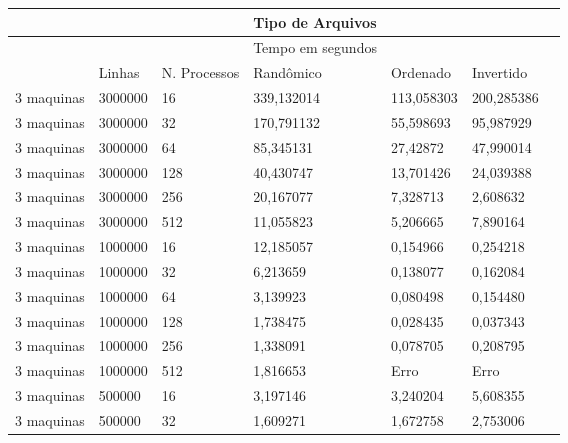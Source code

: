 \documentclass[12pt]{article}
\begin{document}
\begin{table}[]
\begin{tabular}{l|llllll}
           &                 &                     & Tipo de Arquivos  &            &            \\  \hline
           &                 &                     & Tempo em segundos &            &            \\ \hline
           & Linhas & N. Processos & Randômico         & Ordenado   & Invertido  \\ \hline
3 maquinas & 3000000         & 16                  & 339,132014        & 113,058303 & 200,285386 \\
3 maquinas & 3000000    & 32              & 170,791132          & 55,598693         & 95,987929  &            \\
3 maquinas & 3000000    & 64              & 85,345131           & 27,42872          & 47,990014  &            \\
3 maquinas & 3000000    & 128             & 40,430747           & 13,701426         & 24,039388  &            \\
3 maquinas & 3000000    & 256             & 20,167077           & 7,328713          & 2,608632   &            \\
3 maquinas & 3000000    & 512             & 11,055823           & 5,206665          & 7,890164   &            \\
3 maquinas & 1000000    & 16              & 12,185057           & 0,154966          & 0,254218   &            \\
3 maquinas & 1000000    & 32              & 6,213659            & 0,138077          & 0,162084   &            \\
3 maquinas & 1000000    & 64              & 3,139923            & 0,080498          & 0,154480   &            \\
3 maquinas & 1000000    & 128             & 1,738475            & 0,028435          & 0,037343   &            \\
3 maquinas & 1000000    & 256             & 1,338091            & 0,078705          & 0,208795   &            \\
3 maquinas & 1000000    & 512             & 1,816653            & Erro              & Erro       &            \\
3 maquinas & 500000     & 16              & 3,197146            & 3,240204          & 5,608355   &            \\
3 maquinas & 500000     & 32              & 1,609271            & 1,672758          & 2,753006   &            \\

\end{tabular}
\end{table}
\end{document}
